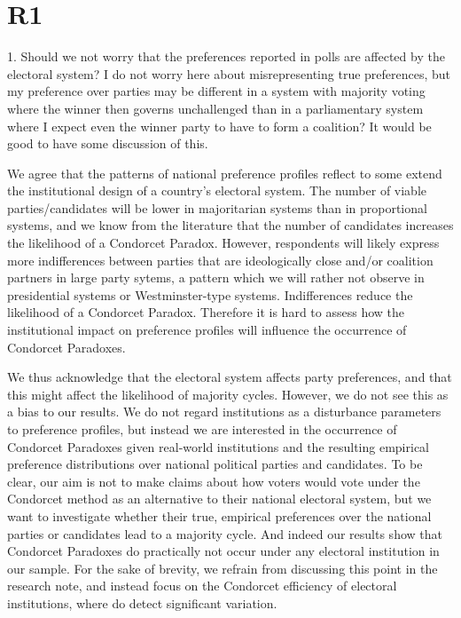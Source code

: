 \documentclass[a4paper, 12pt]{scrartcl}
\theoremstyle{break}
\newenvironment{changes}{\par\color{violet}\par\addvspace{\baselineskip}}{\par\addvspace{\baselineskip}}
\begin{document}
\section{R1} 
\begin{changes}
1. Should we not worry that the preferences reported in polls are affected by the electoral system? I do not worry here about misrepresenting true preferences, but my preference over parties may be different in a system with majority voting where the winner then governs unchallenged than in a parliamentary system where I expect even the winner party to have to form a coalition? It would be good to have some discussion of this.
\end{changes}

We agree that the patterns of national preference profiles reflect to some extend the institutional design of a country's electoral system. The number of viable parties/candidates will be lower in majoritarian systems than in proportional systems, and we know from the literature that the number of candidates increases the likelihood of a Condorcet Paradox. However, respondents will likely express more indifferences between parties that are ideologically close and/or coalition partners in large party sytems, a pattern which we will rather not observe in presidential systems or Westminster-type systems. Indifferences reduce the likelihood of a Condorcet Paradox. Therefore it is hard to assess how the institutional impact on preference profiles will influence the occurrence of Condorcet Paradoxes. 

We thus acknowledge that the electoral system affects party preferences, and that this might affect the likelihood of majority cycles. However, we do not see this as a bias to our results. We do not regard institutions as a disturbance parameters to  preference profiles, but  instead we are interested in the occurrence of Condorcet Paradoxes given real-world institutions and the resulting empirical preference distributions over national political parties and candidates. To be clear, our aim is not to make claims about how voters would vote under the Condorcet method as an alternative to their national electoral system, but we want to investigate whether their true, empirical preferences over the national parties or candidates lead to a majority cycle. And indeed our results show that Condorcet Paradoxes do practically not occur under any electoral institution in our sample.  For the sake of brevity, we refrain from discussing this point in the research note, and instead focus on the Condorcet efficiency of electoral institutions, where do detect significant variation.
\end{document}
